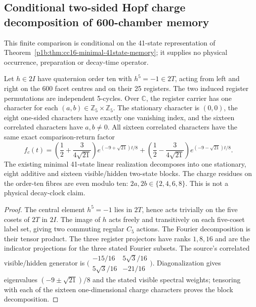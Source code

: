 \documentclass[12pt,a4paper]{article}
\begin{document}
\subsection{Conditional two-sided Hopf charge decomposition of 600-chamber memory}
\label{cc19:sec:two-hopf-charges}
This finite comparison is conditional on the 41-state representation
of Theorem~\ref{p1b:thm:cc16-minimal-41state-memory}; it supplies
no physical occurrence, preparation or decay-time operator.

\begin{theorem}
\label{cc19:thm:joint-memory-charges}
Let $h\in2I$ have quaternion order ten with $h^5=-1\in2T$,
acting from left and right on the 600 facet centres and on their
25 registers. The two induced register permutations are independent
5-cycles. Over $\mathbb C$, the register carrier has one character
for each $(a,b)\in\mathbb Z_5\times\mathbb Z_5$. The stationary
character is $(0,0)$, the eight one-sided characters have exactly one
vanishing index, and the sixteen correlated characters have $a,b\ne0$.
All sixteen correlated characters have the same exact comparison-return
factor
\[
\boxed{f_c(t)=\left(\frac12+\frac3{4\sqrt{21}}\right)
   e^{(-9+\sqrt{21})t/8}
 +\left(\frac12-\frac3{4\sqrt{21}}\right)
   e^{(-9-\sqrt{21})t/8}.}
\]
The existing minimal 41-state linear realization decomposes into
one stationary, eight additive and sixteen visible/hidden two-state
blocks. The charge residues on the order-ten fibres are even modulo
ten: $2a,2b\in\{2,4,6,8\}$. This is not a physical decay-clock claim.
\end{theorem}
\begin{proof}
The central element $h^5=-1$ lies in $2T$, hence acts trivially on
the five cosets of $2T$ in $2I$. The image of $h$ acts freely and
transitively on each five-coset label set, giving two commuting
regular $C_5$ actions. The Fourier decomposition is their tensor
product. The three register projectors have ranks $1,8,16$ and are
the indicator projections for the three stated Fourier subsets.
The source's correlated visible/hidden generator is
$\bigl(\begin{smallmatrix}-15/16&5\sqrt3/16\\5\sqrt3/16&-21/16\end{smallmatrix}\bigr)$.
Diagonalization gives eigenvalues $(-9\pm\sqrt{21})/8$ and the
stated visible spectral weights; tensoring with each of the sixteen
one-dimensional charge characters proves the block decomposition.
\end{proof}
\end{document}
